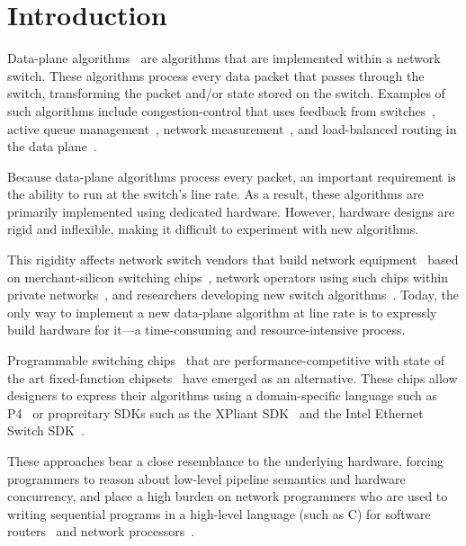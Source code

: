 \section{Introduction}
\label{s:intro}

Data-plane algorithms~\cite{cestan} are algorithms that are implemented within
a network switch. These algorithms process every data packet that passes
through the switch, transforming the packet and/or state stored on the switch.
Examples of such algorithms include congestion-control that uses feedback from
switches~\cite{xcp, rcp, pdq, dctcp}, active queue management~\cite{codel},
network measurement~\cite{opensketch, bitmap_george, elephant_george}, and
load-balanced routing in the data plane~\cite{conga}.

Because data-plane algorithms process every packet, an important requirement is
the ability to run at the switch's line rate.  As a result, these algorithms
are primarily implemented using dedicated hardware. However, hardware designs
are rigid and inflexible, making it difficult to experiment with new
algorithms.

This rigidity affects network switch vendors that build network
equipment~\cite{cisco_nexus, dell_force10, arista_7050} based on
merchant-silicon switching chips~\cite{trident, tomahawk, mellanox},  network
operators using such chips within private networks~\cite{google,facebook,vl2},
and researchers developing new switch algorithms~\cite{xcp, codel, d3, detail,
pdq}. Today, the only way to implement a new data-plane algorithm at line rate
is to expressly build hardware for it---a time-consuming and resource-intensive
process.

Programmable switching chips~\cite{flexpipe, xpliant, rmt} that are
performance-competitive with state of the art fixed-function
chipsets~\cite{trident, tomahawk, mellanox} have emerged as an alternative.
These chips allow designers to express their algorithms using a domain-specific
language such as P4~\cite{p4} or propreitary SDKs such as the XPliant
SDK~\cite{xpliant_sdk, xpliant_sdk2} and the Intel Ethernet Switch
SDK~\cite{intel_sdk}.

These approaches bear a close resemblance to the underlying hardware, forcing
programmers to reason about low-level pipeline semantics and hardware
concurrency, and place a high burden on network programmers who are used to
writing sequential programs in a high-level language (such as C) for software
routers~\cite{click} and network processors~\cite{ixp4xx, ixp2800}.

